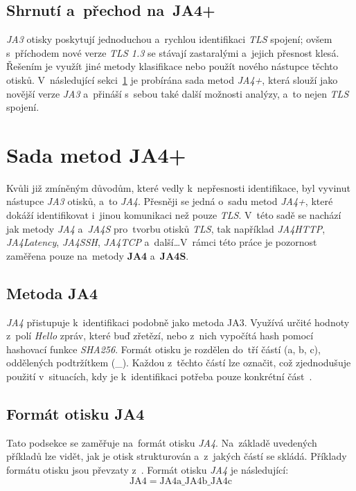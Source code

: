 \subsection{Shrnutí a~přechod na~JA4+}
\textit{JA3} otisky poskytují jednoduchou a~rychlou identifikaci \textit{TLS} spojení; ovšem s~příchodem nové verze \textit{TLS 1.3} se stávají zastaralými a~jejich přesnost klesá. Řešením je využít jiné metody klasifikace nebo použít nového nástupce těchto otisků. V~následující sekci~\ref{sec:JA4+} je probírána sada metod \textit{JA4+}, která slouží jako novější verze \textit{JA3} a~přináší s~sebou také další možnosti analýzy, a~to nejen \textit{TLS} spojení.

\section{Sada metod JA4+}
\label{sec:JA4+}
Kvůli již zmíněným důvodům, které vedly k~nepřesnosti identifikace, byl vyvinut nástupce \textit{JA3} otisků, a~to \textit{JA4}. Přesněji se jedná o~sadu metod \textit{JA4+}, které dokáží identifikovat i~jinou komunikaci než pouze \textit{TLS}. V~této sadě se nachází jak metody \textit{JA4} a~\textit{JA4S} pro~tvorbu otisků \textit{TLS}, tak například \textit{JA4HTTP}, \textit{JA4Latency}, \textit{JA4SSH}, \textit{JA4TCP} a~další\dots V~rámci této práce je pozornost zaměřena pouze na~metody \textbf{JA4} a~\textbf{JA4S}.

\subsection{Metoda JA4}
\textit{JA4} přistupuje k~identifikaci podobně jako metoda JA3. Využívá určité hodnoty z~polí \textit{Hello} zpráv, které buď zřetězí, nebo z~nich vypočítá hash pomocí hashovací funkce \textit{SHA256}. Formát otisku je rozdělen do~tří částí (a, b, c), oddělených podtržítkem (\_). Každou z~těchto částí lze označit, což zjednodušuje použití v~situacích, kdy je k~identifikaci potřeba pouze konkrétní část~\cite{Althouse2023}. 

\subsection{Formát otisku JA4}
Tato podsekce se zaměřuje na~formát otisku \textit{JA4}. Na~základě uvedených příkladů lze vidět, jak je otisk strukturován a~z~jakých částí se skládá. Příklady formátu otisku jsou převzaty z~\cite{Althouse2023}. Formát otisku \textit{JA4} je následující:
\[
	\text{JA4} = \text{JA4a} \_ \text{JA4b} \_ \text{JA4c}
\]

